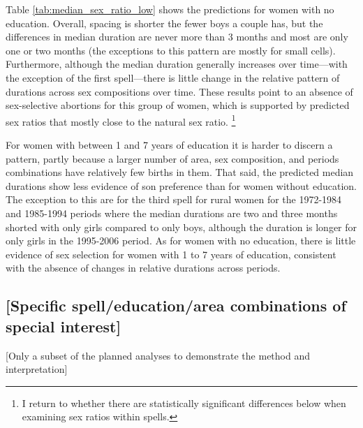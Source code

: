 \documentclass[12pt,letterpaper]{article}
\begin{document}


Table \ref{tab:median_sex_ratio_low} shows the predictions for women 
with no education.
Overall, spacing is shorter the fewer boys a couple has, but the
differences in median duration are never more than 3 months and most
are only one or two months
(the exceptions to this pattern are mostly for small cells).
Furthermore, although the median duration generally increases over 
time---with the exception of the first spell---there is little 
change in the relative pattern of durations across sex compositions
over time.
These results point to an absence of sex-selective abortions for 
this group of women, which is supported by predicted sex ratios
that mostly close to the natural sex ratio.%
\footnote{
I return to whether there are statistically significant 
differences below when examining sex ratios within spells.
}




For women with between 1 and 7 years of education it is harder
to discern a pattern, partly because a larger number of area,
sex composition, and periods combinations have relatively few 
births in them.
That said, the predicted median durations show less evidence 
of son preference than for women without education.
The exception to this are for the third spell for rural women
for the 1972-1984 and 1985-1994 periods where the median
durations are two and three months shorted with only girls
compared to only boys, although the duration is longer for
only girls in the 1995-2006 period.
As for women with no education, there is little evidence of
sex selection for women with 1 to 7 years of education,
consistent with the absence of changes in relative durations
across periods.









\clearpage

\subsection{[Specific spell/education/area combinations of special interest]}
[Only a subset of the planned analyses to demonstrate the method and interpretation]
\end{document}
